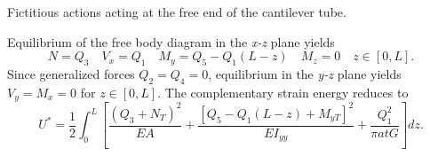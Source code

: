 \documentclass{AeroStructure-ERJohnson}
\begin{document}
\begin{example*}
{\caption{Fictitious actions acting at the free end of the cantilever tube.}\label{fig6.11}}


Equilibrium of the free body diagram in the \textit{x-z} plane yields
\begin{equation*}
N=Q_{3} \quad V_{x}=Q_{1} \quad M_{y}=Q_{5}-Q_{1}(L-z) \quad M_{z}=0 \quad z \in[0, L].\tag{i}
\end{equation*}
Since generalized forces $Q_{2}=Q_{4}=0$, equilibrium in the \textit{y-z} plane yields $V_{y}=M_{x}=0$ for $z \in[0, L]$. The complementary strain energy reduces to
\begin{equation*}
U^{*}=\frac{1}{2} \int_{0}^{L}\left[\frac{\left(Q_{3}+N_{T}\right)^{2}}{E A}+\frac{\left[Q_{5}-Q_{1}(L-z)+M_{y T}\right]^{2}}{E I_{y y}}+\frac{Q_{1}^{2}}{\pi a t G}\right] d z.\tag{j}
\end{equation*}
\vspace*{6pt}
\clearpage


\end{example*}
\end{document}
